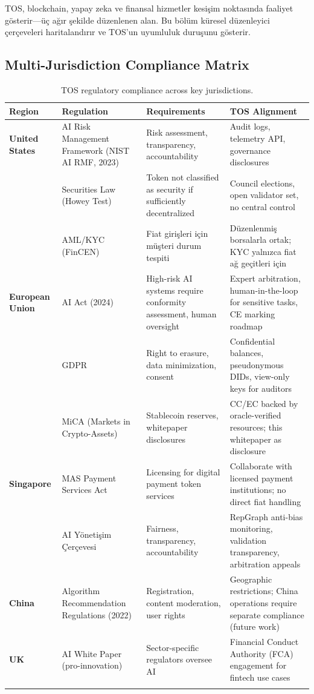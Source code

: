 \documentclass[11pt]{article}
\begin{document}
\begin{itemize}[noitemsep]
\begin{itemize}[noitemsep]
\begin{itemize}[noitemsep]
\begin{itemize}[noitemsep]
\begin{itemize}[noitemsep]
\begin{itemize}[noitemsep]
\begin{itemize}[noitemsep]
\begin{enumerate}[noitemsep]
\begin{itemize}[noitemsep]
TOS, blockchain, yapay zeka ve finansal hizmetler kesişim noktasında faaliyet gösterir—üç ağır şekilde düzenlenen alan. Bu bölüm küresel düzenleyici çerçeveleri haritalandırır ve TOS'un uyumluluk duruşunu gösterir.

\subsection{Multi-Jurisdiction Compliance Matrix}

\begin{longtable}{@{}p{}p{}p{}p{}@{}}
\toprule
\textbf{Region} & \textbf{Regulation} & \textbf{Requirements} & \textbf{TOS Alignment} \\\midrule
\textbf{United States} & AI Risk Management Framework (NIST AI RMF, 2023) & Risk assessment, transparency, accountability & Audit logs, telemetry API, governance disclosures \\
 & Securities Law (Howey Test) & Token not classified as security if sufficiently decentralized & Council elections, open validator set, no central control \\
 & AML/KYC (FinCEN) & Fiat girişleri için müşteri durum tespiti & Düzenlenmiş borsalarla ortak; KYC yalnızca fiat ağ geçitleri için \\
\textbf{European Union} & AI Act (2024) & High-risk AI systems require conformity assessment, human oversight & Expert arbitration, human-in-the-loop for sensitive tasks, CE marking roadmap \\
 & GDPR & Right to erasure, data minimization, consent & Confidential balances, pseudonymous DIDs, view-only keys for auditors \\
 & MiCA (Markets in Crypto-Assets) & Stablecoin reserves, whitepaper disclosures & CC/EC backed by oracle-verified resources; this whitepaper as disclosure \\
\textbf{Singapore} & MAS Payment Services Act & Licensing for digital payment token services & Collaborate with licensed payment institutions; no direct fiat handling \\
 & AI Yönetişim Çerçevesi & Fairness, transparency, accountability & RepGraph anti-bias monitoring, validation transparency, arbitration appeals \\
\textbf{China} & Algorithm Recommendation Regulations (2022) & Registration, content moderation, user rights & Geographic restrictions; China operations require separate compliance (future work) \\
\textbf{UK} & AI White Paper (pro-innovation) & Sector-specific regulators oversee AI & Financial Conduct Authority (FCA) engagement for fintech use cases \\
\bottomrule
\caption{TOS regulatory compliance across key jurisdictions.}
\end{longtable}


\end{itemize}
\end{enumerate}
\end{itemize}
\end{itemize}
\end{itemize}
\end{itemize}
\end{itemize}
\end{itemize}
\end{itemize}
\end{document}
